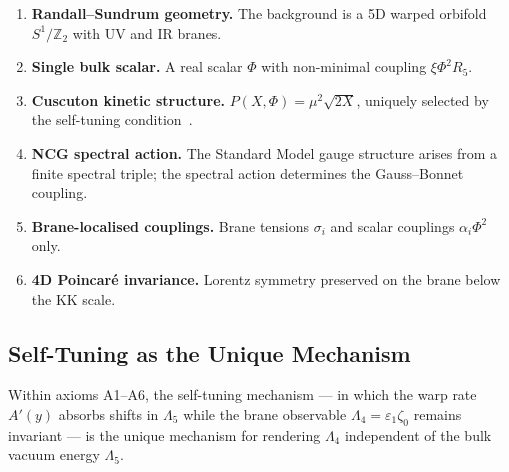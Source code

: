 \begin{enumerate}
  \item[\textbf{(A1)}] \textbf{Randall--Sundrum geometry.} The background is a 5D warped orbifold $S^1/\mathbb{Z}_2$ with UV and IR branes.
  \item[\textbf{(A2)}] \textbf{Single bulk scalar.} A real scalar $\Phi$ with non-minimal coupling $\xi\Phi^2 R_5$.
  \item[\textbf{(A3)}] \textbf{Cuscuton kinetic structure.} $P(X,\Phi) = \mu^2\sqrt{2X}$, uniquely selected by the self-tuning condition~\cite{ch3:afshordi2007,ch3:derham2016}.
  \item[\textbf{(A4)}] \textbf{NCG spectral action.} The Standard Model gauge structure arises from a finite spectral triple; the spectral action determines the Gauss--Bonnet coupling.
  \item[\textbf{(A5)}] \textbf{Brane-localised couplings.} Brane tensions $\sigma_i$ and scalar couplings $\alpha_i \Phi^2$ only.
  \item[\textbf{(A6)}] \textbf{4D Poincar\'e invariance.} Lorentz symmetry preserved on the brane below the KK scale.
\end{enumerate}

\subsection{Self-Tuning as the Unique Mechanism}
\label{sec:3-vnogo-uniqueness}

\begin{proposition}
\label{thm:vnogo-unique}
Within axioms \textup{A1--A6}, the self-tuning mechanism --- in which the warp rate $A'(y)$ absorbs shifts in $\Lambda_5$ while the brane observable $\Lambda_4 = \varepsilon_1\zeta_0$ remains invariant --- is the unique mechanism for rendering $\Lambda_4$ independent of the bulk vacuum energy $\Lambda_5$.
\end{proposition}

